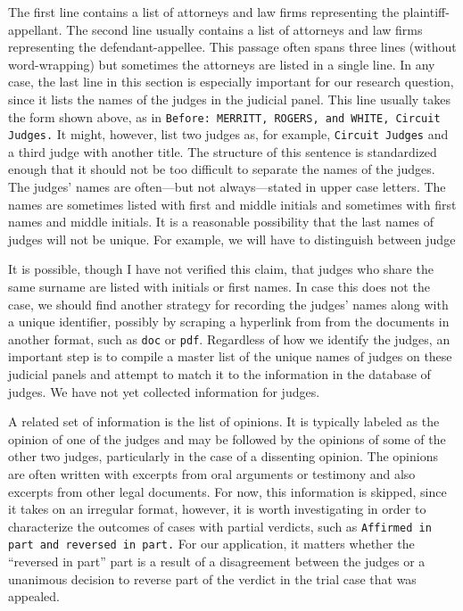 \documentclass[11pt]{paper}
\begin{document}
The first line contains a list of attorneys and law firms 
representing the plaintiff-appellant. 
The second line usually contains a list of attorneys 
and law firms representing the defendant-appellee. 
This passage often spans three lines (without word-wrapping)
but sometimes the attorneys are listed in a single line.
In any case, the last line in this section is especially important 
for our research question, 
since it lists the names of the judges in the judicial panel. 
This line usually takes the form shown above, 
as in \texttt{Before: MERRITT, ROGERS, and WHITE, Circuit Judges.}
It might, however, list two judges as, for example, \texttt{Circuit Judges}
and a third judge with another title. 
The structure of this sentence is standardized enough that 
it should not be too difficult to separate the names of the judges. 
The judges' names are often---but not always---stated in upper case letters. 
The names are sometimes listed with first and middle initials
and sometimes with first names and middle initials. 
It is a reasonable possibility that the last names of judges will not be unique. 
For example, we will have to distinguish between judge

It is possible, though I have not verified this claim, 
that judges who share the same surname
are listed with initials or first names. 
In case this does not the case, we should find another strategy 
for recording the judges' names
along with a unique identifier, 
possibly by scraping a hyperlink from from the documents in another format, 
such as \texttt{doc} or  \texttt{pdf}. 
Regardless of how we identify the judges, 
an important step is to compile a master list 
of the unique names of judges on these judicial panels
and attempt to match it to the information in the database of judges. 
We have not yet collected information for judges. 

A related set of information is the list of opinions. 
It is typically labeled as the opinion of one of the judges
and may be followed by the opinions of some of the other two judges, 
particularly in the case of a dissenting opinion. 
The opinions are often written with excerpts from oral arguments or testimony
and also excerpts from other legal documents. 
For now, this information is skipped, since it takes on an irregular format, 
however, it is worth investigating in order to characterize 
the outcomes of cases with partial verdicts, 
such as \texttt{Affirmed in part and reversed in part.}
For our application, it matters whether the ``reversed in part'' part is a result of 
a disagreement between the judges 
or a unanimous decision to reverse part of the verdict 
in the trial case that was appealed. 
\end{document}
